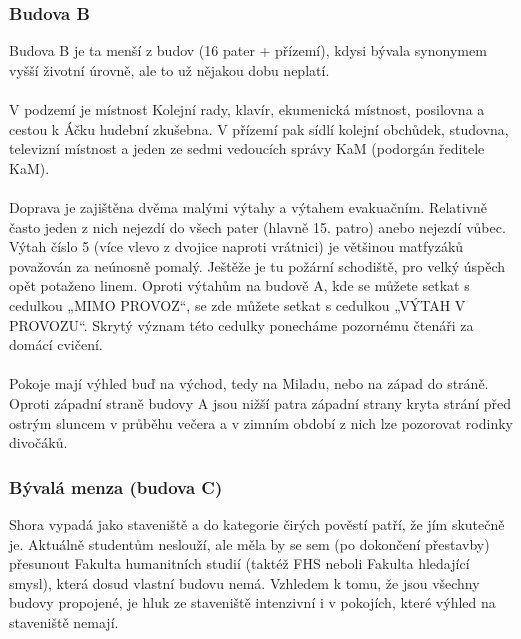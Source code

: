 \subsubsection{Budova B}
Budova B je ta menší z budov (16 pater + přízemí), kdysi bývala synonymem vyšší
životní úrovně, ale to už nějakou dobu neplatí.
\\\\
V podzemí je místnost Kolejní rady, klavír, ekumenická místnost, posilovna a
cestou k Áčku hudební zkušebna. V přízemí pak sídlí kolejní obchůdek, studovna,
televizní místnost a jeden ze sedmi vedoucích správy KaM (podorgán ředitele
KaM).
\\\\
Doprava je zajištěna dvěma malými výtahy a výtahem evakuačním. Relativně často
jeden z nich nejezdí do všech pater (hlavně 15. patro) anebo nejezdí vůbec.
Výtah číslo 5 (více vlevo z dvojice naproti vrátnici) je většinou matfyzáků
považován za neúnosně pomalý. Ještěže je tu požární schodiště, pro velký úspěch
opět potaženo linem. Oproti výtahům na budově A, kde se můžete setkat s cedulkou
„MIMO PROVOZ“, se zde můžete setkat s cedulkou „VÝTAH V PROVOZU“. Skrytý význam
této cedulky ponecháme pozornému čtenáři za domácí cvičení.
\\\\
Pokoje mají výhled buď na východ, tedy na Miladu, nebo na západ do stráně.
Oproti západní straně budovy A jsou nižší patra západní strany kryta strání před
ostrým sluncem v průběhu večera a v zimním období z nich lze pozorovat rodinky
divočáků.


\subsubsection{Bývalá menza (budova C)}
Shora vypadá jako staveniště a do kategorie čirých pověstí patří, že jím
skutečně je. Aktuálně studentům neslouží, ale měla by se sem (po dokončení
přestavby) přesunout Fakulta humanitních studií (taktéž FHS neboli Fakulta
hledající smysl), která dosud vlastní budovu nemá. Vzhledem k tomu, že jsou
všechny budovy propojené, je hluk ze staveniště intenzivní i v pokojích, které
výhled na staveniště nemají.



